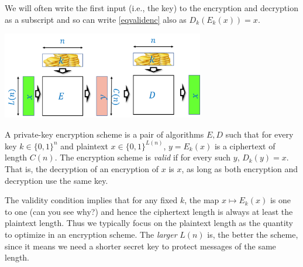 We will often write the first input (i.e., the key) to the encryption
and decryption as a subscript and so can write \eqref{eqvalidenc} also
as \(D_k(E_k(x))=x\).

\begin{marginfigure}
\centering
\includegraphics[width=\linewidth, height=1.5in, keepaspectratio]{../figure/encryptionvalid.png}
\caption{A private-key encryption scheme is a pair of algorithms \(E,D\)
such that for every key \(k\in \{0,1\}^n\) and plaintext
\(x\in \{0,1\}^{L(n)}\), \(y=E_k(x)\) is a ciphertext of length
\(C(n)\). The encryption scheme is \emph{valid} if for every such \(y\),
\(D_k(y)=x\). That is, the decryption of an encryption of \(x\) is
\(x\), as long as both encryption and decryption use the same key.}
\label{validencryption}
\end{marginfigure}

The validity condition implies that for any fixed \(k\), the map
\(x \mapsto E_k(x)\) is one to one (can you see why?) and hence the
ciphertext length is always at least the plaintext length. Thus we
typically focus on the plaintext length as the quantity to optimize in
an encryption scheme. The \emph{larger} \(L(n)\) is, the better the
scheme, since it means we need a shorter secret key to protect messages
of the same length.

